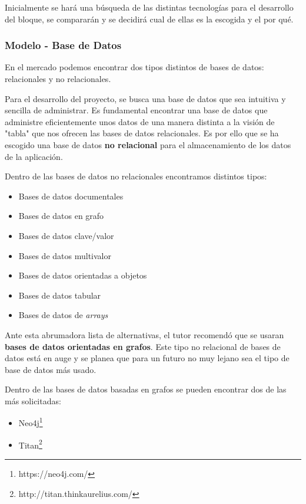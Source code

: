 Inicialmente se hará una búsqueda de las distintas tecnologías para el desarrollo del bloque, se compararán y se decidirá cual de ellas es la escogida y el por qué.

\subsubsection{Modelo - Base de Datos}

En el mercado podemos encontrar dos tipos distintos de bases de datos: relacionales y no relacionales\cite{tipobd}. 

Para el desarrollo del proyecto, se busca una base de datos que sea intuitiva y sencilla de administrar. Es fundamental encontrar una base de datos que administre eficientemente unos datos de una manera distinta a la visión de "tabla" que nos ofrecen las bases de datos relacionales. Es por ello que se ha escogido una base de datos \textbf{no relacional} para el almacenamiento de los datos de la aplicación.

Dentro de las bases de datos no relacionales encontramos distintos tipos:

\begin{itemize}
    \item Bases de datos documentales
    \item Bases de datos en grafo
    \item Bases de datos clave/valor
    \item Bases de datos multivalor
    \item Bases de datos orientadas a objetos
    \item Bases de datos tabular
    \item Bases de datos de \textit{arrays}
\end{itemize}

Ante esta abrumadora lista de alternativas, el tutor recomendó que se usaran\textbf{ bases de datos orientadas en grafos}. Este tipo no relacional de bases de datos está en auge y se planea que para un futuro no muy lejano sea el tipo de base de datos más usado\cite{bdnorel1}\cite{bdnorel2}. 

Dentro de las bases de datos basadas en grafos se pueden encontrar dos de las más solicitadas:

\begin{itemize}
    \item Neo4j\footnote{https://neo4j.com/}
    \item Titan\footnote{http://titan.thinkaurelius.com/}
\end{itemize}



